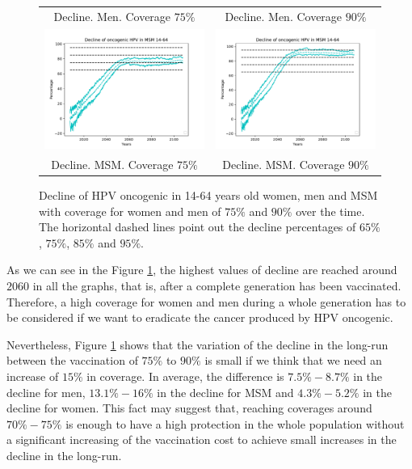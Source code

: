 \begin{figure}[!]
\begin{tabular}{cc}
		Decline. Men. Coverage $75\%$	& Decline. Men. Coverage $90\%$ \\ 		
		\includegraphics[width=0.5\linewidth]{IMGs/9.-Erradicacion_ONCO/onco_MSM_75.pdf}	& 
		\includegraphics[width=0.5\linewidth]{IMGs/9.-Erradicacion_ONCO/onco_MSM_90.pdf}  \\ 
		Decline. MSM. Coverage $75\%$	& Decline. MSM. Coverage $90\%$
	\end{tabular} 
	\caption{Decline of HPV oncogenic in 14-64 years old women, men and MSM with coverage for women and men of $75\%$ and $90\%$ over the time. The horizontal dashed lines point out the decline percentages of $65\%$, $75\%$, $85\%$ and $95\%$.}
	\label{fig:erradicacion}
\end{figure}

As we can see in the Figure \ref{fig:erradicacion}, the highest values of decline are reached around $2060$ in all the graphs, that is, after a complete generation has been vaccinated. Therefore, a high coverage for women and men during a whole generation has to be considered if we want to eradicate the cancer produced by HPV oncogenic. 

Nevertheless, Figure \ref{fig:erradicacion} shows that the variation of the decline in the long-run between the vaccination of $75\%$ to $90\%$ is small if we think that we need an increase of $15\%$ in coverage. In average, the difference is $7.5\% - 8.7\%$ in the decline for men, $13.1\%-16\%$ in the decline for MSM and $4.3\%-5.2\%$ in the decline for women. This fact may suggest that, reaching coverages around $70\% - 75\%$ is enough to have a high protection in the whole population without a significant increasing of the vaccination cost to achieve small increases in the decline in the long-run.

